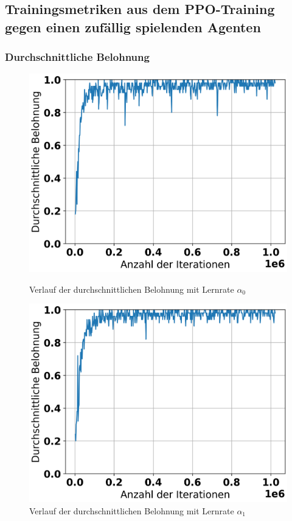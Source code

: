 \subsection{Trainingsmetriken aus dem PPO-Training gegen einen zufällig spielenden Agenten}

\subsubsection{Durchschnittliche Belohnung}

\begin{figure}[H]
	\begin{minipage}[c]{0.48\linewidth}
		\includegraphics[width=\linewidth]{Bilder/random-training/history_random_0_003_graph_episode_rewards.png}
		\caption{Verlauf der durchschnittlichen Belohnung mit Lernrate $\alpha_0$}
	\end{minipage}
	\hfill
	\begin{minipage}[c]{0.48\linewidth}
		\includegraphics[width=\linewidth]{Bilder/random-training/history_random_0_001_graph_episode_rewards.png}
		\caption{Verlauf der durchschnittlichen Belohnung mit Lernrate $\alpha_1$}
	\end{minipage}
\end{figure}

